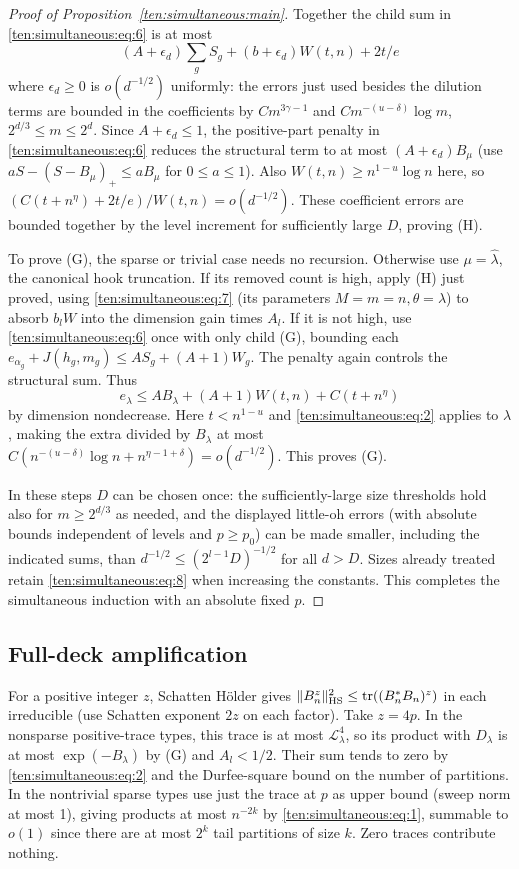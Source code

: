 \begin{proof}[Proof of Proposition~\ref{ten:simultaneous:main}]
Together the child sum in \eqref{ten:simultaneous:eq:6} is at most
\[
 (A+\epsilon_d)\sum_g S_g + (b+\epsilon_d)W(t,n)+2t/e
\]
where \(\epsilon_d\ge0\) is \(o(d^{-1/2})\) uniformly: the errors just used besides the dilution terms are bounded in the coefficients by \(C m^{3\gamma-1}\) and \(C m^{-(u-\delta)}\log m\), \(2^{d/3}\le m\le 2^d\). Since \(A+\epsilon_d\le1\), the positive-part penalty in \eqref{ten:simultaneous:eq:6} reduces the structural term to at most \((A+\epsilon_d)B_\mu\) (use \(aS-(S-B_\mu)_+\le a B_\mu\) for \(0\le a\le1\)). Also \(W(t,n)\ge n^{1-u}\log n\) here, so \((C(t+n^\eta)+2t/e)/W(t,n)=o(d^{-1/2})\). These coefficient errors are bounded together by the level increment for sufficiently large \(D\), proving (H).

To prove (G), the sparse or trivial case needs no recursion. Otherwise use \(\mu=\widehat\lambda\), the canonical hook truncation. If its removed count is high, apply (H) just proved, using \eqref{ten:simultaneous:eq:7} (its parameters \(M=m=n,\theta=\lambda\)) to absorb \(b_l W\) into the dimension gain times \(A_l\). If it is not high, use \eqref{ten:simultaneous:eq:6} once with only child (G), bounding each \(e_{\alpha_g}+J(h_g,m_g)\le A S_g+(A+1)W_g\). The penalty again controls the structural sum. Thus
\[
 e_\lambda\le A B_\lambda+(A+1)W(t,n)+ C(t+n^\eta)
\]
by dimension nondecrease. Here \(t<n^{1-u}\) and \eqref{ten:simultaneous:eq:2} applies to \(\lambda\), making the extra divided by \(B_\lambda\) at most \(C(n^{-(u-\delta)}\log n+n^{\eta-1+\delta})=o(d^{-1/2})\). This proves (G).

In these steps \(D\) can be chosen once: the sufficiently-large size thresholds hold also for \(m\ge2^{d/3}\) as needed, and the displayed little-oh errors (with absolute bounds independent of levels and \(p\ge p_0\)) can be made smaller, including the indicated sums, than \(d^{-1/2}\le(2^{l-1}D)^{-1/2}\) for all \(d>D\). Sizes already treated retain \eqref{ten:simultaneous:eq:8} when increasing the constants. This completes the simultaneous induction with an absolute fixed \(p\).

\end{proof}

\subsection{Full-deck amplification}


For a positive integer \(z\), Schatten H\"older gives \(\|B_n^z\|_{\rm HS}^2\le \operatorname{tr}((B_n^*B_n)^z)\) in each irreducible (use Schatten exponent \(2z\) on each factor). Take \(z=4p\). In the nonsparse positive-trace types, this trace is at most \(\mathcal L_\lambda^4\), so its product with \(D_\lambda\) is at most \(\exp(-B_\lambda)\) by (G) and \(A_l<1/2\). Their sum tends to zero by \eqref{ten:simultaneous:eq:2} and the Durfee-square bound on the number of partitions. In the nontrivial sparse types use just the trace at \(p\) as upper bound (sweep norm at most 1), giving products at most \(n^{-2k}\) by \eqref{ten:simultaneous:eq:1}, summable to \(o(1)\) since there are at most \(2^k\) tail partitions of size \(k\). Zero traces contribute nothing.

